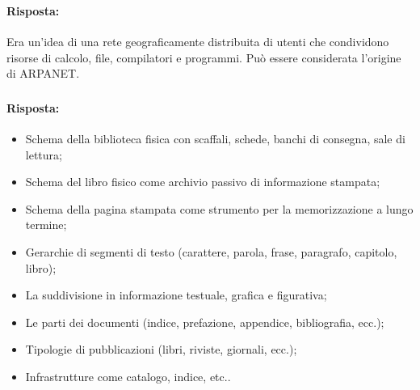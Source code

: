 \subsubsection{}


\paragraph{Risposta:} Era un'idea di una rete geograficamente distribuita di utenti che condividono
risorse di calcolo, file, compilatori e programmi. Può essere considerata l'origine di ARPANET.

\subsubsection{}


\paragraph{Risposta:} 


\begin{itemize}
    \item [\textcolor{red}{\XSolidBrush}] Schema della biblioteca fisica con scaffali, schede, banchi di consegna, sale di lettura;
    \item [\textcolor{red}{\XSolidBrush}] Schema del libro fisico come archivio passivo di informazione stampata;
    \item [\textcolor{red}{\XSolidBrush}] Schema della pagina stampata come strumento per la memorizzazione a lungo termine;
    \item [\textcolor{green}{\Checkmark}] Gerarchie di segmenti di testo (carattere, parola, frase, paragrafo, capitolo, libro);
    \item [\textcolor{green}{\Checkmark}] La suddivisione in informazione testuale, grafica e figurativa;
    \item [\textcolor{green}{\Checkmark}] Le parti dei documenti (indice, prefazione, appendice, bibliografia, ecc.);
    \item [\textcolor{green}{\Checkmark}] Tipologie di pubblicazioni (libri, riviste, giornali, ecc.);
    \item [\textcolor{green}{\Checkmark}] Infrastrutture come catalogo, indice, etc..
\end{itemize}

